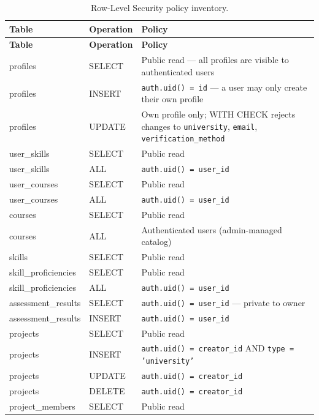 \documentclass[12pt,a4paper]{article}
\begin{document}
\begin{longtable}{@{} L{3.2cm} L{2.2cm} L{8.8cm} @{}}
\caption{Row-Level Security policy inventory.}
\label{tab:rls} \\
\toprule
\textbf{Table} & \textbf{Operation} & \textbf{Policy} \\
\midrule
\endfirsthead
\toprule
\textbf{Table} & \textbf{Operation} & \textbf{Policy} \\
\midrule
\endhead
\bottomrule
\endlastfoot
profiles            & SELECT  & Public read --- all profiles are visible to authenticated users \\
profiles            & INSERT  & \texttt{auth.uid() = id} --- a user may only create their own profile \\
profiles            & UPDATE  & Own profile only; WITH CHECK rejects changes to \texttt{university}, \texttt{email}, \texttt{verification\_method} \\[4pt]
user\_skills        & SELECT  & Public read \\
user\_skills        & ALL     & \texttt{auth.uid() = user\_id} \\[4pt]
user\_courses       & SELECT  & Public read \\
user\_courses       & ALL     & \texttt{auth.uid() = user\_id} \\[4pt]
courses             & SELECT  & Public read \\
courses             & ALL     & Authenticated users (admin-managed catalog) \\[4pt]
skills              & SELECT  & Public read \\[4pt]
skill\_proficiencies & SELECT & Public read \\
skill\_proficiencies & ALL    & \texttt{auth.uid() = user\_id} \\[4pt]
assessment\_results & SELECT  & \texttt{auth.uid() = user\_id} --- private to owner \\
assessment\_results & INSERT  & \texttt{auth.uid() = user\_id} \\[4pt]
projects            & SELECT  & Public read \\
projects            & INSERT  & \texttt{auth.uid() = creator\_id} AND \texttt{type = 'university'} \\
projects            & UPDATE  & \texttt{auth.uid() = creator\_id} \\
projects            & DELETE  & \texttt{auth.uid() = creator\_id} \\[4pt]
project\_members    & SELECT  & Public read \\

\end{longtable}
\end{document}
